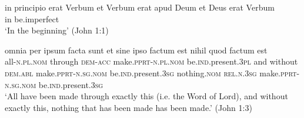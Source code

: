 \documentclass[a4paper, oneside, 12pt]{report}
\newcommand*{\category}[1]{\textsc{#1}}
\newcommand{\translate}[1]{`#1'}
\begin{document}
\begin{exe}
    \ex\label{ex:text.john.1.1} 
    \gll in principio erat Verbum et Verbum erat apud Deum et Deus erat Verbum \\
    in {} be.\acs{imperfect}  \\
    \glt \translate{In the beginning} (John 1:1)
    
    \ex\label{ex:text.john.1.3}
    \gll omnia per ipsum facta sunt 
    et sine ipso factum est nihil quod factum est \\
    all-\category{n}.\category{pl}.\category{nom} through \category{dem}-\category{acc}
    make.\category{pprt}-\category{n}.\category{pl}.\category{nom} 
    be.\category{ind}.\acs{present}.\category{3pl} 
    and without \category{dem}.\category{abl} 
    make.\category{pprt}-\category{n}.\category{sg}.\category{nom} 
    be.\category{ind}.\acs{present}.\category{3sg}
    nothing.\category{nom}
    \category{rel}.\category{n}.\category{3sg}
    make.\category{pprt}-\category{n}.\category{sg}.\category{nom} 
    be.\category{ind}.\acs{present}.\category{3sg} \\
    \glt \translate{All have been made through exactly this (i.e. the Word of Lord),
    and without exactly this, nothing that has been made has been made.} (John 1:3)
\end{exe}
\end{document}

